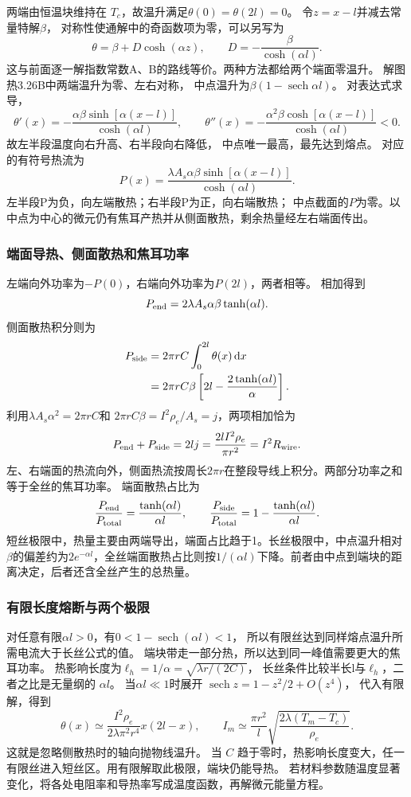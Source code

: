 \documentclass[UTF8,fontset=fandol,a4paper,11pt]{ctexart}
\newcommand{\dd}{\mathop{}\!\mathrm{d}}
\begin{document}
两端由恒温块维持在 $T_c$，故温升满足$\theta(0)=\theta(2l)=0$。
令$z=x-l$并减去常量特解$\beta$，
对称性使通解中的奇函数项为零，可以另写为
\[
\theta=\beta+D\cosh(\alpha z),\qquad
D=-\frac\beta{\cosh(\alpha l)}.
\]
这与前面逐一解指数常数A、B的路线等价。两种方法都给两个端面零温升。
解图热3.26B中两端温升为零、左右对称，
中点温升为$\beta(1-\operatorname{sech}\alpha l)$。
对表达式求导，
\[
\theta'(x)=-\frac{\alpha\beta\sinh[\alpha(x-l)]}{\cosh(\alpha l)},\qquad
\theta''(x)=-\frac{\alpha^2\beta\cosh[\alpha(x-l)]}{\cosh(\alpha l)}<0.
\]
故左半段温度向右升高、右半段向右降低，
中点唯一最高，最先达到熔点。
对应的有符号热流为
\[
P(x)=\frac{\lambda A_s\alpha\beta\sinh[\alpha(x-l)]}{\cosh(\alpha l)}.
\]
左半段P为负，向左端散热；右半段P为正，向右端散热；
中点截面的$P$为零。以中点为中心的微元仍有焦耳产热并从侧面散热，剩余热量经左右端面传出。

\subsubsection*{端面导热、侧面散热和焦耳功率}
左端向外功率为$-P(0)$，右端向外功率为$P(2l)$，两者相等。
相加得到
\[
P_{\rm end}=2\lambda A_s\alpha\beta\tanh(\alpha l).
\]
侧面散热积分则为
\[
\begin{aligned}
P_{\rm side}
&=2\pi rC\int_0^{2l}\theta(x)\dd x\\
&=2\pi rC\beta\left[2l-\frac{2\tanh(\alpha l)}\alpha\right].
\end{aligned}
\]
利用$\lambda A_s\alpha^2=2\pi rC$和
$2\pi rC\beta=I^2\rho_e/A_s=j$，两项相加恰为
\[
P_{\rm end}+P_{\rm side}=2lj
=\frac{2lI^2\rho_e}{\pi r^2}=I^2R_{\rm wire}.
\]
左、右端面的热流向外，侧面热流按周长$2\pi r$在整段导线上积分。两部分功率之和等于全丝的焦耳功率。
端面散热占比为
\[
\frac{P_{\rm end}}{P_{\rm total}}
=\frac{\tanh(\alpha l)}{\alpha l},\qquad
\frac{P_{\rm side}}{P_{\rm total}}
=1-\frac{\tanh(\alpha l)}{\alpha l}.
\]
短丝极限中，热量主要由两端导出，端面占比趋于1。长丝极限中，中点温升相对$\beta$的偏差约为$2e^{-\alpha l}$，全丝端面散热占比则按$1/(\alpha l)$下降。前者由中点到端块的距离决定，后者还含全丝产生的总热量。

\subsubsection*{有限长度熔断与两个极限}
对任意有限$\alpha l>0$，有$0<1-\operatorname{sech}(\alpha l)<1$，
所以有限丝达到同样熔点温升所需电流大于长丝公式的值。
端块带走一部分热，所以达到同一峰值需要更大的焦耳功率。
热影响长度为$\ell_h=1/\alpha=\sqrt{\lambda r/(2C)}$，
长丝条件比较半长l与$\ell_h$，二者之比是无量纲的 $\alpha l$。
当$\alpha l\ll1$时展开
$\operatorname{sech}z=1-z^2/2+O(z^4)$，
代入有限解，得到
\[
\theta(x)\simeq\frac{I^2\rho_e}{2\lambda\pi^2r^4}x(2l-x),\qquad
I_m\simeq\frac{\pi r^2}{l}
\sqrt{\frac{2\lambda(T_m-T_c)}{\rho_e}}.
\]
这就是忽略侧散热时的轴向抛物线温升。
当 $C$ 趋于零时，热影响长度变大，任一有限丝进入短丝区。用有限解取此极限，端块仍能导热。
若材料参数随温度显著变化，将各处电阻率和导热率写成温度函数，再解微元能量方程。
\end{document}
